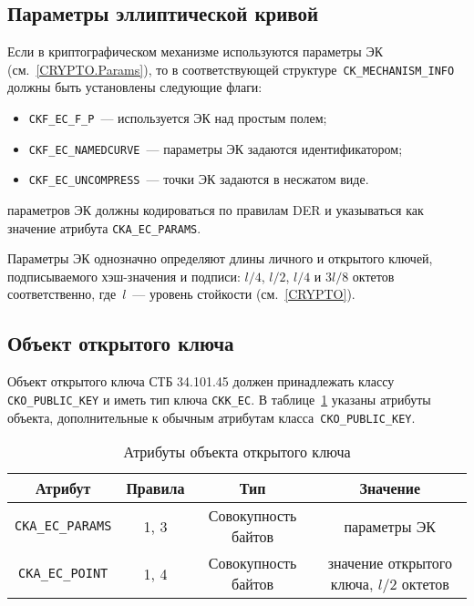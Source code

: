 \subsection{Параметры эллиптической кривой}

Если в криптографическом механизме используются параметры ЭК 
(см.~\ref{CRYPTO.Params}), то в соответствующей 
структуре~\verb|CK_MECHANISM_INFO| должны быть установлены 
следующие флаги: 
\begin{itemize}
\item
\verb|CKF_EC_F_P|~--- используется ЭК над простым полем;
\item
\verb|CKF_EC_NAMEDCURVE|~--- параметры ЭК задаются идентификатором;
\item
\verb|CKF_EC_UNCOMPRESS|~--- точки ЭК задаются в несжатом виде.
\end{itemize}

 параметров ЭК должны кодироваться по правилам  
DER и указываться как значение атрибута \verb|CKA_EC_PARAMS|.

Параметры ЭК однозначно определяют длины личного и открытого ключей, 
подписываемого хэш-значения и подписи: $l/4$, $l/2$, $l/4$ и $3l/8$ 
октетов соответственно, где~$l$~--- уровень стойкости (см.~\ref{CRYPTO}). 

\subsection{Объект открытого ключа}


Объект открытого ключа СТБ 34.101.45 должен принадлежать
классу \verb|CKO_PUBLIC_KEY| и иметь тип ключа \verb|CKK_EC|.
%
В таблице~\ref{Table.CRYPTOKI.EcPubkeyAttrs} указаны
атрибуты объекта, дополнительные к обычным атрибутам 
класса~\verb|CKO_PUBLIC_KEY|.

\begin{table}[H]
\caption{Атрибуты объекта открытого ключа}\label{Table.CRYPTOKI.EcPubkeyAttrs}
\begin{tabular}{|c|c|c|c|}
\hline
Атрибут & Правила & Тип & Значение\\
\hline
\hline
\verb|CKA_EC_PARAMS| & 1, 3 & Совокупность байтов &
параметры ЭК\\
\hline
\verb|CKA_EC_POINT| & 1, 4 & Совокупность байтов &
значение открытого ключа, $l/2$ октетов\\
\hline
\end{tabular}
\end{table}


